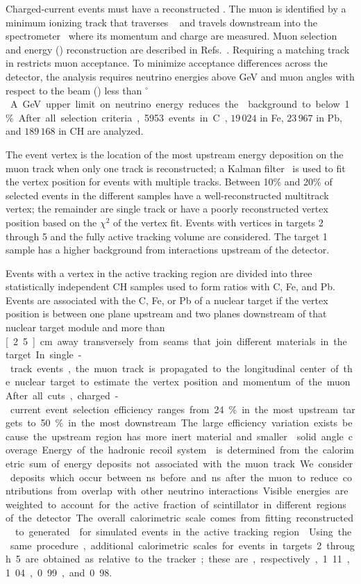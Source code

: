 
Charged-current \numu events must have a reconstructed \mum.
The muon is identified by a minimum ionizing track that
traverses \minerva~\cite{minerva_nim} and travels downstream into the
\minos spectrometer~\cite{Michael:2008bc} where its momentum
and charge are measured.
Muon selection and energy (\Emu) reconstruction are described in Refs.~\cite{nubarprl,nuprl,minerva_nim}.
Requiring a matching track in \minos restricts muon acceptance.
To minimize acceptance differences across the \minerva detector, the analysis
requires neutrino energies above \unit[2]{GeV} and muon angles with respect to the beam (\thetamu) 
less than \unit[17]{$^{\circ}$}.
A \unit[20]{GeV} upper limit on neutrino energy reduces the \numubar background to below 1\%.
After all selection criteria, 5953 events in C, $19\,024$ in Fe, $23\,967$ in Pb, and $189\,168$ in CH are analyzed.

The event vertex is the location of the most upstream energy deposition on the muon track
when only one track is reconstructed; a Kalman filter~\cite{Fruhwirth1987444,Luchsinger1993263} is used to fit the vertex position for events with multiple tracks.
Between 10\% and 20\% of selected events in the different samples have a well-reconstructed multitrack vertex; the remainder are single track
or have a poorly reconstructed vertex position based on the $\chi^2$ of the vertex fit.
Events with vertices in targets 2 through 5 and the fully active tracking volume are considered. 
The target 1 sample has a higher background from interactions upstream of the detector.

Events with a vertex in the active tracking region are divided into three statistically independent CH samples used to form ratios with C, Fe, and Pb.
Events are associated with the C, Fe, or Pb of a nuclear target if the vertex position is between one plane upstream and two planes downstream of that nuclear target module and more than 
 \unit[2.5]{cm} away transversely from seams that join different materials in the target.
In single-track events, the muon track is propagated to the longitudinal center of the nuclear target to estimate the vertex 
position and momentum of the muon.
After all cuts, charged-current event selection efficiency ranges from 24\% in the most upstream 
targets to 50\% in the most downstream. 
The large efficiency variation exists because the upstream region has more inert material and smaller \minos solid angle coverage.   

Energy of the hadronic recoil system \recoilE is determined from the calorimetric sum
of energy deposits not associated with the muon track. 
We consider deposits which occur
between \unit[20]{ns} before and \unit[35]{ns} after the muon to reduce contributions from overlap with other neutrino interactions.
Visible energies are weighted to account for the active fraction of scintillator in different regions of the detector.
The overall calorimetric scale comes from fitting reconstructed \recoilE 
to generated \recoilE for simulated events in the active tracking region~\cite{minerva_nim}.
Using the same procedure, additional calorimetric scales for events in 
targets 2 through 5 are obtained as relative to the tracker;
these are, respectively, 1.11, 1.04, 0.99, and 0.98.  

